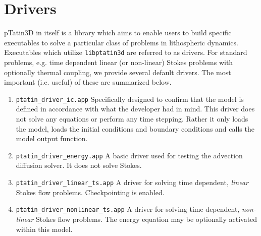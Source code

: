 \documentclass[paper=a4, fontsize=11pt,twoside]{scrartcl}
\newcommand{\ptat}{{{\sc pTatin3D}}}
\newcommand{\unix}[1]{\texttt{\footnotesize #1}}
\begin{document}
{{%
\newpage
\section{Drivers}
{\ptat} in itself is a library which aims to enable users to build specific executables to solve a particular class of problems in lithospheric dynamics.
Executables which utilize \unix{libptatin3d} are referred to as drivers.
For standard problems, e.g. time dependent linear (or non-linear) Stokes problems with optionally thermal coupling, we provide several default drivers.
The most important (i.e. useful) of these are summarized below.

\begin{enumerate}
	\item \unix{ptatin\_driver\_ic.app}
	Specifically designed to confirm that the model is defined in accordance with what the developer had in mind. This driver does not solve any equations or perform any time stepping. Rather it only loads the model, loads the initial conditions and boundary conditions and calls the model output function.
	
	\item \unix{ptatin\_driver\_energy.app}
	A basic driver used for testing the advection diffusion solver. It does not solve Stokes.
	
	\item \unix{ptatin\_driver\_linear\_ts.app}
	A driver for solving time dependent, {\it linear} Stokes flow problems. Checkpointing is enabled.

	\item \unix{ptatin\_driver\_nonlinear\_ts.app}
	A driver for solving time dependent, {\it non-linear} Stokes flow problems. The energy equation may be optionally activated within this model.
\end{enumerate}

}}
\end{document}
